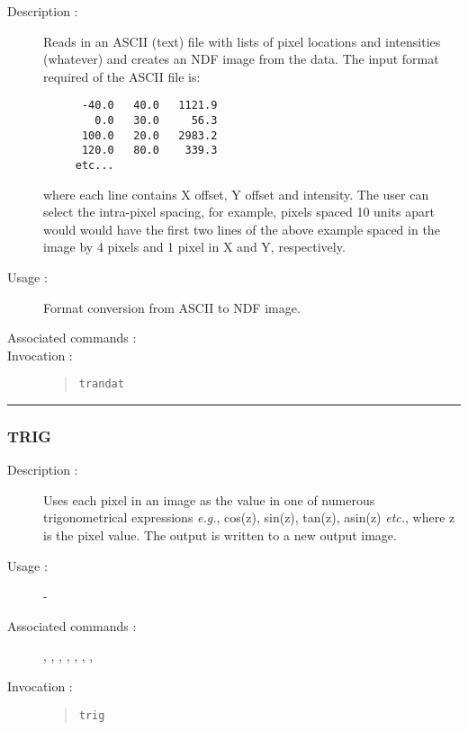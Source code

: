 \begin{description}

\item[Description :] Reads in an ASCII (text) file with lists of pixel
locations and intensities (whatever) and creates an NDF image from the
data.  The input format required of the ASCII file is:

\begin{small}
\begin{verbatim}
      -40.0   40.0   1121.9
        0.0   30.0     56.3
      100.0   20.0   2983.2
      120.0   80.0    339.3
     etc...
\end{verbatim}
\end{small}

where each line contains X offset, Y offset and intensity.  The user
can select the intra-pixel spacing, for example, pixels spaced 10 units
apart would would have the first two lines of the above example spaced
in the image by 4 pixels and 1 pixel in X and Y, respectively.

\item[Usage :] Format conversion from ASCII to NDF image.
\item[Associated commands :] {\tt {}}
\item[Invocation :]

\begin{quote}{\tt  trandat }\end{quote}

\end{description}

\hrule
\subsubsection*{\label{TRIG}TRIG}

\begin{description}

\item[Description :] Uses each pixel in an image as the value in one of
numerous trigonometrical expressions \emph{e.g.}, cos(z), sin(z),
tan(z), asin(z) \emph{etc.}, where z is the pixel value.  The output is
written to a new output image.

\item[Usage :] -

\item[Associated commands :] {\tt {}},
{\tt {}}, {\tt {}},
{\tt {}}, {\tt {}},
{\tt {}}, {\tt {}},
{\tt {}}

\item[Invocation :]

\begin{quote}{\tt  trig }\end{quote}

\end{description}


